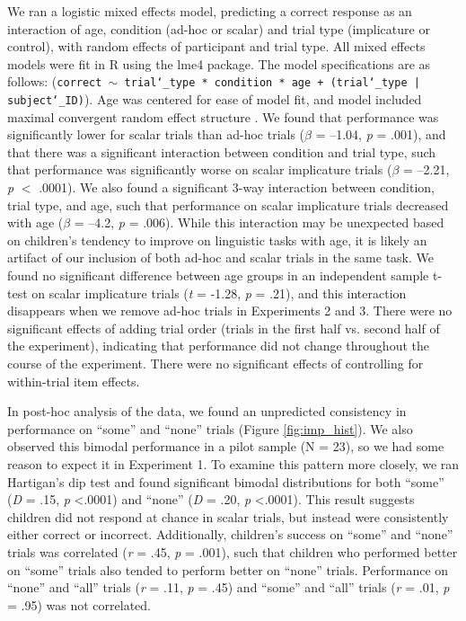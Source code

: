 \documentclass[man]{apa2}
\begin{document}

We ran a logistic mixed effects model, predicting a correct response as an interaction of age, condition (ad-hoc or scalar) and trial type (implicature or control), with random effects of participant and trial type. All mixed effects models were fit in R using the lme4 package. The model specifications are as follows: ({\tt{correct $\sim$ trial\char`_type * condition * age + (trial\char`_type | subject\char`_ID)}}). Age was centered for ease of model fit, and model included maximal convergent random effect structure \cite{barr2013}. We found that performance was significantly lower for scalar trials than ad-hoc trials ($\beta$ = --1.04, \textit{p} = .001), and that there was a significant interaction between condition and trial type, such that performance was significantly worse on scalar implicature trials ($\beta$ = --2.21, \textit{p} $<$ .0001). We also found a significant 3-way interaction between condition, trial type, and age, such that performance on scalar implicature trials decreased with age ($\beta$ = --4.2, \textit{p} = .006). While this interaction may be unexpected based on children's tendency to improve on linguistic tasks with age, it is likely an artifact of our inclusion of both ad-hoc and scalar trials in the same task. We found no significant difference between age groups in an independent sample t-test on scalar implicature trials (\emph{t} = -1.28, \emph{p} = .21), and this interaction disappears when we remove ad-hoc trials in Experiments 2 and 3. There were no significant effects of adding trial order (trials in the first half vs. second half of the experiment), indicating that performance did not change throughout the course of the experiment. There were no significant effects of controlling for within-trial item effects.

In post-hoc analysis of the data, we found an unpredicted consistency in performance on ``some'' and ``none'' trials (Figure \ref{fig:imp_hist}). We also observed this bimodal performance in a pilot sample (N = 23), so we had some reason to expect it in Experiment 1. To examine this pattern more closely, we ran Hartigan's dip test and found significant bimodal distributions for both ``some'' (\textit{D} = .15, \textit{p} \textless  .0001) and ``none'' (\textit{D} = .20, \textit{p} \textless  .0001). This result suggests children did not respond at chance in scalar trials, but instead were consistently either correct or incorrect. Additionally, children's success on ``some'' and ``none'' trials was correlated (\textit{r} = .45, \textit{p} =  .001), such that children who performed better on ``some'' trials also tended to perform better on ``none'' trials. Performance on ``none'' and ``all'' trials (\textit{r} = .11, \textit{p} = .45) and ``some'' and ``all'' trials (\textit{r} = .01, \textit{p} = .95) was not correlated.
\end{document}
